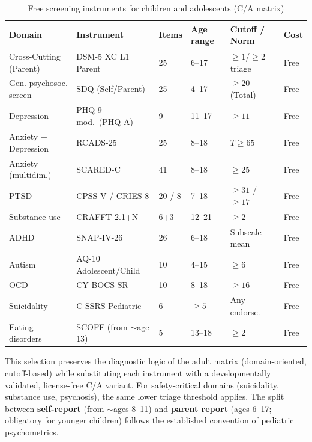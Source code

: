 \documentclass[11pt,a4paper]{article}
\newenvironment{CompactLongTable}{%
  \begingroup
  \footnotesize
  \setstretch{1.0}%
  \setlength{\LTpre}{0pt}%
  \setlength{\LTpost}{0pt}%
}{%
  \endgroup
}
\begin{document}
\begin{table}[htbp]
\centering
\caption{Free screening instruments for children and adolescents (C/A matrix)}
\label{tab:instrumente_ca}
\begin{CompactLongTable}
\begin{tabular}{@{}L{2.4cm}L{2.4cm}L{0.9cm}L{1.5cm}L{2.0cm}L{1.5cm}@{}}
\toprule
\textbf{Domain} & \textbf{Instrument} & \textbf{Items} & \textbf{Age range} & \textbf{Cutoff / Norm} & \textbf{Cost} \\
\midrule
Cross-Cutting (Parent) & DSM-5 XC L1 Parent & 25 & 6--17 & $\geq 1$/$\geq 2$ triage & Free \\
\addlinespace
Gen. psychosoc. screen & SDQ (Self/Parent) & 25 & 4--17 & $\geq 20$ (Total) & Free \\
\addlinespace
Depression & PHQ-9 mod.\ (PHQ-A) & 9 & 11--17 & $\geq 11$ & Free \\
\addlinespace
Anxiety + Depression & RCADS-25 & 25 & 8--18 & $T \geq 65$ & Free \\
\addlinespace
Anxiety (multidim.) & SCARED-C & 41 & 8--18 & $\geq 25$ & Free \\
\addlinespace
PTSD & CPSS-V / CRIES-8 & 20 / 8 & 7--18 & $\geq 31$ / $\geq 17$ & Free \\
\addlinespace
Substance use & CRAFFT 2.1+N & 6+3 & 12--21 & $\geq 2$ & Free \\
\addlinespace
ADHD & SNAP-IV-26 & 26 & 6--18 & Subscale mean & Free \\
\addlinespace
Autism & AQ-10 Adolescent/Child & 10 & 4--15 & $\geq 6$ & Free \\
\addlinespace
OCD & CY-BOCS-SR & 10 & 8--18 & $\geq 16$ & Free \\
\addlinespace
Suicidality & C-SSRS Pediatric & 6 & $\geq 5$ & Any endorse.\ & Free \\
\addlinespace
Eating disorders & SCOFF (from $\sim$age 13) & 5 & 13--18 & $\geq 2$ & Free \\
\bottomrule
\end{tabular}
\end{CompactLongTable}
\end{table}

This selection preserves the diagnostic logic of the adult matrix (domain-oriented, cutoff-based) while substituting each instrument with a developmentally validated, license-free C/A variant. For safety-critical domains (suicidality, substance use, psychosis), the same lower triage threshold applies. The split between \textbf{self-report} (from $\sim$ages 8--11) and \textbf{parent report} (ages 6--17; obligatory for younger children) follows the established convention of pediatric psychometrics.
\end{document}
